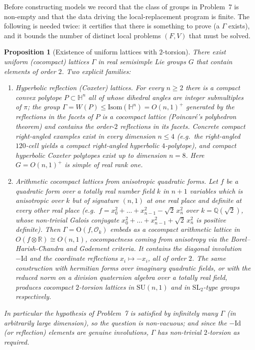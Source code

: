 \documentclass[12pt]{article}
\newtheorem{proposition}[theorem]{Proposition}
\theoremstyle{definition}
\begin{document}
Before constructing models we record that the class of groups in Problem~7 is
non-empty and that the data driving the local-replacement program is finite. The
following is needed twice: it certifies that there is something to prove (a
$\Gamma$ exists), and it bounds the number of distinct local problems $(F,V)$
that must be solved.

\begin{proposition}[Existence of uniform lattices with $2$-torsion]
\label{prop:exist}
There exist uniform (cocompact) lattices $\Gamma$ in real semisimple Lie groups
$G$ that contain elements of order $2$. Two explicit families:
\begin{enumerate}
\item[\rm(E1)] \emph{Hyperbolic reflection (Coxeter) lattices.} For every
$n\ge2$ there is a compact convex polytope $P\subset\mathbb{H}^n$ all of whose
dihedral angles are integer submultiples of $\pi$; the group
$\Gamma=W(P)\le\mathrm{Isom}(\mathbb{H}^n)=O(n,1)^{+}$ generated by the
reflections in the facets of $P$ is a cocompact lattice (Poincaré's polyhedron
theorem) and contains the order-$2$ reflections in its facets. Concrete compact
right-angled examples exist in every dimension $n\le4$ (e.g.\ the right-angled
$120$-cell yields a compact right-angled hyperbolic $4$-polytope), and compact
hyperbolic Coxeter polytopes exist up to dimension $n=8$. Here $G=O(n,1)^+$ is
simple of real rank one.
\item[\rm(E2)] \emph{Arithmetic cocompact lattices from anisotropic quadratic
forms.} Let $f$ be a quadratic form over a totally real number field $k$ in
$n+1$ variables which is anisotropic over $k$ but of signature $(n,1)$ at one
real place and definite at every other real place (e.g.\
$f=x_0^2+\dots+x_{n-1}^2-\sqrt2\,x_n^2$ over $k=\mathbb{Q}(\sqrt2)$, whose
non-trivial Galois conjugate $x_0^2+\dots+x_{n-1}^2+\sqrt2\,x_n^2$ is positive
definite). Then $\Gamma=\mathrm{O}(f,\mathcal{O}_k)$ embeds as a cocompact
arithmetic lattice in $O(f\otimes\mathbb{R})\cong O(n,1)$, cocompactness coming
from anisotropy via the Borel--Harish-Chandra and Godement criteria. It contains
the diagonal involution $-\mathrm{Id}$ and the coordinate reflections
$x_i\mapsto-x_i$, all of order $2$. The same construction with hermitian forms
over imaginary quadratic fields, or with the reduced norm on a division
quaternion algebra over a totally real field, produces cocompact $2$-torsion
lattices in $\mathrm{SU}(n,1)$ and in $\mathrm{SL}_2$-type groups respectively.
\end{enumerate}
In particular the hypothesis of Problem~7 is satisfied by infinitely many
$\Gamma$ (in arbitrarily large dimension), so the question is non-vacuous; and
since the $-\mathrm{Id}$ (or reflection) elements are genuine involutions,
$\Gamma$ has non-trivial $2$-torsion as required.
\end{proposition}
\end{document}
